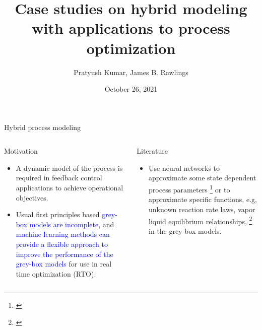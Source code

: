 \documentclass[xcolor=dvipsnames, 8pt]{beamer} %
\title{Case studies on hybrid modeling with applications to process optimization}
\date{October 26, 2021}
\author[Pratyush Kumar]{\large Pratyush Kumar,
James B. Rawlings}
\institute[UCSB]{
	\begin{minipage}{4in}
		\vspace{-10pt}
		\centering
		\raisebox{-0.1\height}{\texttt{[image: UCSB\_seal]}}
	\end{minipage}
	\vspace{10pt}
	\newline
	{\large Department of chemical engineering}
	\vspace{10pt}
	\newline
	{\large TWCCC meeting}}
\begin{document}
\frame{\titlepage}



\begin{frame}{Hybrid process modeling}

	\begin{columns}
	\column{\textwidth}

	\begin{block}{Motivation}
		\begin{itemize}
		\item A dynamic model of the process is required in feedback
		control applications to achieve operational objectives. \pause
		\item Usual first principles based \textcolor{blue}{grey-box models are
		incomplete}, and \textcolor{blue}{machine learning methods can provide a
		flexible approach to improve the performance of the grey-box
		models} for use in real time optimization (RTO).
		\end{itemize}
	  \end{block}
	  \pause
	  \bigskip
	\begin{block}{Literature}
	  \begin{itemize}
	  \item Use neural networks to approximate some state dependent process
	  parameters \footnote[frame]{\cite{psichogios:ungar:1992}} or to
	  approximate specific functions, e.g, unknown reaction rate laws, vapor
	  liquid equilibrium relationships,
	  \footnote[frame]{\cite{lovelett:avalos:kevrekidis:2019,
	  chen:ierapetritou:2020, bangi:kwon:2020}} in the grey-box models.	
	  \end{itemize}
	\end{block}
  
\end{columns}
\end{frame}
\end{document}
